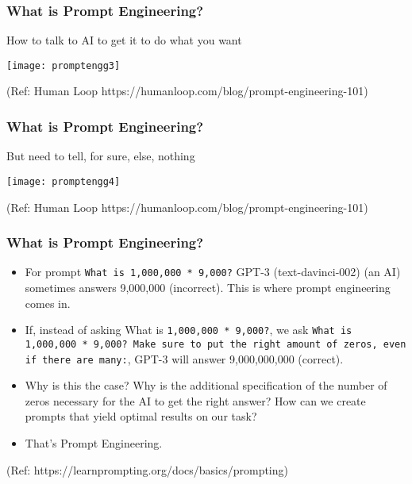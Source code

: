 \begin{frame}[fragile]\frametitle{What is Prompt Engineering?}

How to talk to AI to get it to do what you want


\begin{center}
\texttt{[image: promptengg3]}

{\tiny (Ref: Human Loop https://humanloop.com/blog/prompt-engineering-101)}

\end{center}				
			
			

\end{frame}

\begin{frame}[fragile]\frametitle{What is Prompt Engineering?}

But need to tell, for sure, else, nothing


\begin{center}
\texttt{[image: promptengg4]}

{\tiny (Ref: Human Loop https://humanloop.com/blog/prompt-engineering-101)}

\end{center}				

\end{frame}


\begin{frame}[fragile]\frametitle{What is Prompt Engineering?}

\begin{itemize}
\item For prompt \lstinline|What is 1,000,000 * 9,000?| GPT-3 (text-davinci-002) (an AI) sometimes answers 9,000,000 (incorrect). This is where prompt engineering comes in.
\item If, instead of asking What is \lstinline|1,000,000 * 9,000?|, we ask \lstinline|What is 1,000,000 * 9,000? Make sure to put the right amount of zeros, even if there are many:|, GPT-3 will answer 9,000,000,000 (correct). 
\item Why is this the case? Why is the additional specification of the number of zeros necessary for the AI to get the right answer? How can we create prompts that yield optimal results on our task? 			
\item That's Prompt Engineering.
\end{itemize}

{\tiny (Ref: https://learnprompting.org/docs/basics/prompting)}
\end{frame}


